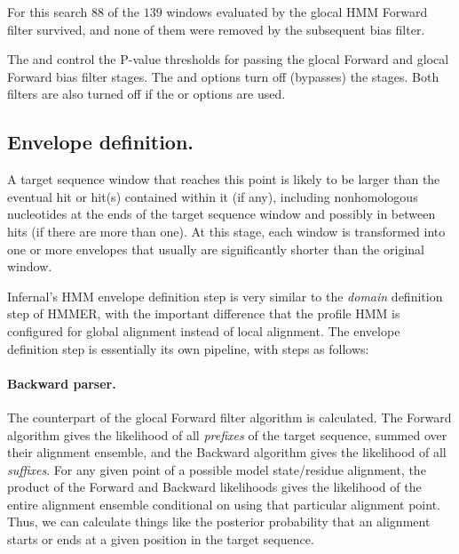 \begin{sreoutput}
For this search $88$ of the $139$ windows evaluated by the glocal HMM
Forward filter survived, and none of them were removed by the subsequent bias filter. 

The  and  control the P-value thresholds for
passing the glocal Forward and glocal Forward bias filter stages.  The
 and  options turn off (bypasses) the
stages. Both filters are also turned off if the  or
 options are used.

\subsection{Envelope definition.}

A target sequence window that reaches this point is likely to be
larger than the eventual hit or hit(s) contained within it (if any),
including nonhomologous nucleotides at the ends of the target sequence
window and possibly in between hits (if there are more than one). At
this stage, each window is transformed into one or more envelopes that
usually are significantly shorter than the original window. 


Infernal's HMM envelope definition step is very similar to the
\emph{domain} definition step of HMMER, with the important difference
that the profile HMM is configured for global alignment instead of
local alignment.  The envelope definition step is essentially its own
pipeline, with steps as follows:

\paragraph{Backward parser.}
The counterpart of the glocal Forward filter algorithm is calculated.
The Forward algorithm gives the likelihood of all \emph{prefixes} of
the target sequence, summed over their alignment ensemble, and the
Backward algorithm gives the likelihood of all \emph{suffixes}. For
any given point of a possible model state/residue alignment, the
product of the Forward and Backward likelihoods gives the likelihood
of the entire alignment ensemble conditional on using that particular
alignment point. Thus, we can calculate things like the posterior
probability that an alignment starts or ends at a given position in
the target sequence.


\end{sreoutput}

